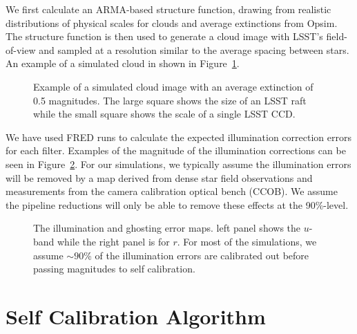 \documentclass[12pt,preprint]{aastex}
\begin{document}
We first calculate an ARMA-based structure function, drawing from realistic distributions of physical scales for clouds and average extinctions from Opsim.  The structure function is then used to generate a cloud image with LSST's field-of-view and sampled at a resolution similar to the average spacing between stars.  An example of a simulated cloud in shown in Figure~\ref{fig:cloud}.  


\begin{figure}
\caption{Example of a simulated cloud image with an average extinction of 0.5 magnitudes.  The large square shows the size of an LSST raft while the small square shows the scale of a single LSST CCD.  \label{fig:cloud}}
\end{figure}

We have used FRED runs to calculate the expected illumination correction errors for each filter.  Examples of the magnitude of the illumination corrections can be seen in Figure~\ref{fig:illum}.  For our simulations, we typically assume the illumination errors will be removed by a map derived from dense star field observations and measurements from the camera calibration optical bench (CCOB).  We assume the pipeline reductions will only be able to remove these effects at the 90\%-level.  

\begin{figure}
\caption{The illumination and ghosting error maps.  left panel shows
the $u$-band while the right panel is for $r$. For most of the simulations, we assume $\sim90$\% of the illumination errors are calibrated out before passing magnitudes to self calibration.  \label{fig:illum}}
\end{figure}


\section{Self Calibration Algorithm}\label{alg}
\end{document}
